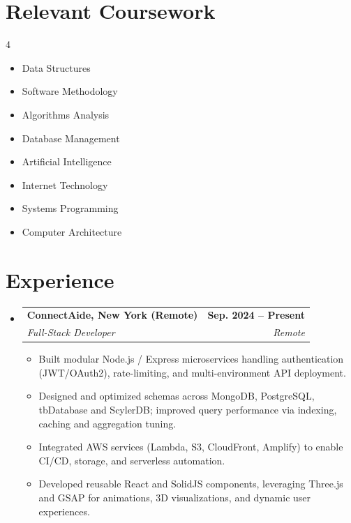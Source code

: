 \documentclass[letterpaper,11pt]{article}
\makeatletter
\newcommand{\resumeItem}[1]{
  \item\small{
    {#1 \vspace{-2pt}}
  }
}
\newcommand{\resumeSubheading}[4]{
  \vspace{-2pt}\item
    \begin{tabular*}{1.0\textwidth}[t]{l@{\extracolsep{\fill}}r}
      \textbf{#1} & \textbf{\small #2} \\
      \textit{\small#3} & \textit{\small #4} \\
    \end{tabular*}\vspace{-7pt}
}
\newcommand{\resumeSubHeadingListStart}{\begin{itemize}[leftmargin=0.0in, label={}]}
\newcommand{\resumeSubHeadingListEnd}{\end{itemize}}
\newcommand{\resumeItemListStart}{\begin{itemize}}
\newcommand{\resumeItemListEnd}{\end{itemize}\vspace{-5pt}}
\makeatother
\begin{document}
 
\section{Relevant Coursework}
        \begin{multicols}{4}
            \begin{itemize}[itemsep=-5pt, parsep=3pt]
                \item\small Data Structures
                \item Software Methodology
                \item Algorithms Analysis
                \item Database Management
                \item Artificial Intelligence
                \item Internet Technology
                \item Systems Programming
                \item Computer Architecture
            \end{itemize}
        \end{multicols}
        \vspace*{2.0\multicolsep}


\section{Experience}
  \resumeSubHeadingListStart

    \resumeSubheading
      {ConnectAide, New York (Remote)}{Sep. 2024 -- Present}
      {Full-Stack Developer}{Remote}
      \resumeItemListStart
        \resumeItem{Built modular Node.js / Express microservices handling authentication (JWT/OAuth2), rate-limiting, and multi-environment API deployment.}
        \resumeItem{Designed and optimized schemas across MongoDB, PostgreSQL, tbDatabase and ScylerDB; improved query performance via indexing, caching and aggregation tuning.}
        \resumeItem{Integrated AWS services (Lambda, S3, CloudFront, Amplify) to enable CI/CD, storage, and serverless automation.}
        \resumeItem{Developed reusable React and SolidJS components, leveraging Three.js and GSAP for animations, 3D visualizations, and dynamic user experiences.}
      \resumeItemListEnd

  \resumeSubHeadingListEnd
\vspace{-10pt}
\end{document}
